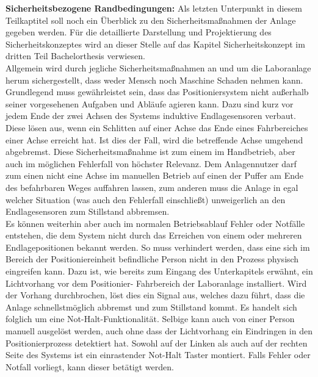 \documentclass[../Bachelorarbeit.tex]{subfiles}
\begin{document}
\smallskip
\newline
\textbf{Sicherheitsbezogene Randbedingungen:}
Als letzten Unterpunkt in diesem Teilkaptitel soll noch ein Überblick zu den Sicherheitsmaßnahmen der Anlage gegeben werden. Für die detaillierte Darstellung und Projektierung des Sicherheitskonzeptes wird an dieser Stelle auf das Kapitel Sicherheitskonzept im dritten Teil Bachelorthesis verwiesen.\\
Allgemein wird durch jegliche Sicherheitsmaßnahmen an und um die Laboranlage herum sichergestellt, dass weder Mensch noch Maschine Schaden nehmen kann. Grundlegend muss gewährleistet sein, dass das Positioniersystem nicht außerhalb seiner vorgesehenen Aufgaben und Abläufe agieren kann. Dazu sind kurz vor jedem Ende der zwei Achsen des Systems induktive Endlagesensoren verbaut. Diese lösen aus, wenn ein Schlitten auf einer Achse das Ende eines Fahrbereiches einer Achse erreicht hat. Ist dies der Fall, wird die betreffende Achse umgehend abgebremst. Diese Sicherheitsmaßnahme ist zum einem im Handbetrieb, aber auch im möglichen Fehlerfall von höchster Relevanz. Dem Anlagennutzer darf zum einen nicht eine Achse im manuellen Betrieb auf einen der Puffer am Ende des befahrbaren Weges auffahren lassen, zum anderen muss die Anlage in egal welcher Situation (was auch den Fehlerfall einschließt) unweigerlich an den Endlagesensoren zum Stillstand abbremsen.\\
Es können weiterhin aber auch im normalen Betriebsablauf Fehler oder Notfälle entstehen, die dem System nicht durch das Erreichen von einem oder mehreren Endlagepositionen bekannt werden. So muss verhindert werden, dass eine sich im Bereich der Positioniereinheit befindliche Person nicht in den Prozess physisch eingreifen kann. Dazu ist, wie bereits zum Eingang des Unterkapitels erwähnt, ein Lichtvorhang vor dem Positionier- \bzw Fahrbereich der Laboranlage installiert. Wird der Vorhang durchbrochen, löst dies ein Signal aus, welches dazu führt, dass die Anlage schnellstmöglich abbremst und zum Stillstand kommt. Es handelt sich folglich um eine Not-Halt-Funktionalität. Selbige kann auch von einer Person manuell ausgelöst werden, auch ohne dass der Lichtvorhang ein Eindringen in den Positionierprozess detektiert hat. Sowohl auf der Linken als auch auf der rechten Seite des Systems ist ein einrastender Not-Halt Taster montiert. Falls Fehler oder Notfall vorliegt, kann dieser betätigt werden.\\
\end{document}
